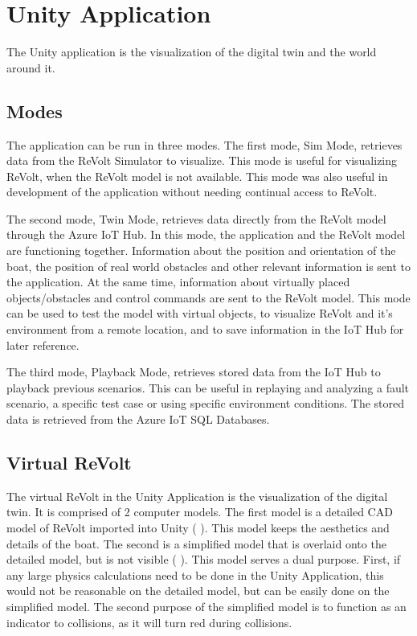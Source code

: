\chapter{Unity Application}
The Unity application is the visualization of the digital twin and the world around it.

\section{Modes}
The application can be run in three modes. The first mode, Sim Mode, retrieves data from the ReVolt Simulator to visualize. This mode is useful for visualizing ReVolt, when the ReVolt model is not available. This mode was also useful in development of the application without needing continual access to ReVolt.

The second mode, Twin Mode, retrieves data directly from the ReVolt model through the Azure IoT Hub. In this mode, the application and the ReVolt model are functioning together. Information about the position and orientation of the boat, the position of real world obstacles and other relevant information is sent to the application. At the same time, information about virtually placed objects/obstacles and control commands are sent to the ReVolt model. This mode can be used to test the model with virtual objects, to visualize ReVolt and it's environment from a remote location, and to save information in the IoT Hub for later reference.

The third mode, Playback Mode, retrieves stored data from the IoT Hub to playback previous scenarios. This can be useful in replaying and analyzing a fault scenario, a specific test case or using specific environment conditions. The stored data is retrieved from the Azure IoT SQL Databases.

\section{Virtual ReVolt}

The virtual ReVolt in the Unity Application is the visualization of the digital twin. It is comprised of 2 computer models. The first model is a detailed CAD model of ReVolt imported into Unity ( ). This model keeps the aesthetics and details of the boat. The second is a simplified model that is overlaid onto the detailed model, but is not visible ( ). This model serves a dual purpose. First, if any large physics calculations need to be done in the Unity Application, this would not be reasonable on the detailed model, but can be easily done on the simplified model. The second purpose of the simplified model is to function as an indicator to collisions, as it will turn red during collisions.

